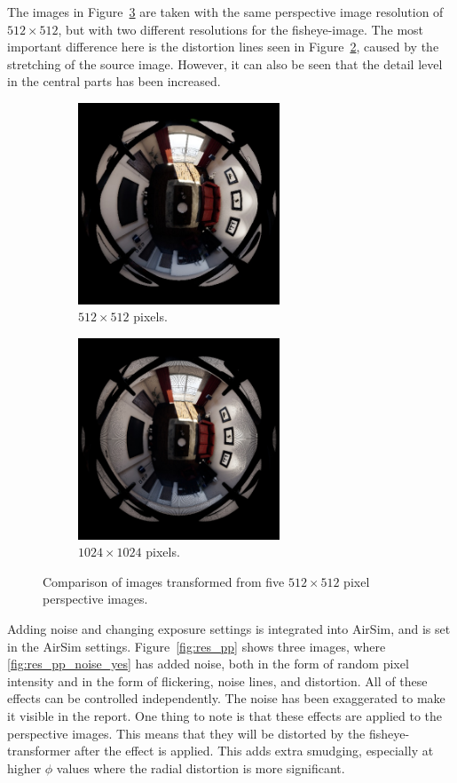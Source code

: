 The images in Figure~\ref{fig:res_comp_equal} are taken with the same perspective image resolution of $512 \times 512$, but with two different resolutions for the fisheye-image. The most important difference here is the distortion lines seen in Figure~\ref{fig:res_comp_equal_512_1024}, caused by the stretching of the source image. However, it can also be seen that the detail level in the central parts has been increased.

\begin{figure}[!htb]
    \centering
    \begin{subfigure}{0.45\textwidth}
        \centering
        \includegraphics[height=6cm]{rapport/fig/Results/512to512.jpeg}
        \caption{$512 \times 512$ pixels.}
        \label{fig:res_comp_equal_512_512}
    \end{subfigure}
    \begin{subfigure}{0.45\textwidth}
        \centering
        \includegraphics[height=6cm]{rapport/fig/Results/512to1024.jpeg}
        \caption{$1024 \times 1024$ pixels.}
        \label{fig:res_comp_equal_512_1024}
    \end{subfigure}
    \caption{Comparison of images transformed from five $512 \times 512$ pixel perspective images.}
    \label{fig:res_comp_equal}
\end{figure}

Adding noise and changing exposure settings is integrated into AirSim, and is set in the AirSim settings. Figure~\ref{fig:res_pp} shows three images, where \ref{fig:res_pp_noise_yes} has added noise, both in the form of random pixel intensity and in the form of flickering, noise lines, and distortion. All of these effects can be controlled independently. The noise has been exaggerated to make it visible in the report. One thing to note is that these effects are applied to the perspective images. This means that they will be distorted by the fisheye-transformer after the effect is applied. This adds extra smudging, especially at higher $\phi$ values where the radial distortion is more significant. 

